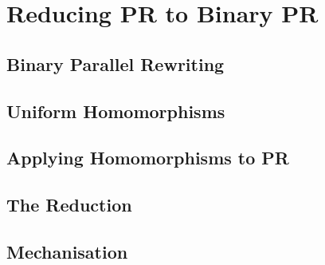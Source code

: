 \chapter{Reducing PR to Binary PR}

\section{Binary Parallel Rewriting}

\section{Uniform Homomorphisms}

\section{Applying Homomorphisms to PR}

\section{The Reduction}

\section{Mechanisation}
